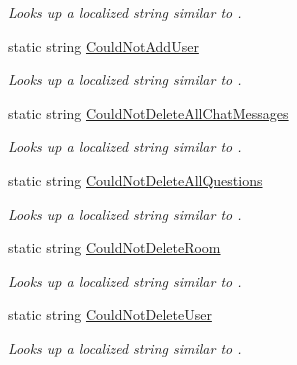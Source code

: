 \begin{DoxyCompactItemize}
\begin{DoxyCompactList}\small\item\em Looks up a localized string similar to . \end{DoxyCompactList}\item 
static string \hyperlink{class_wis_r_1_1_app___resources_1_1_resource_a2d577b28914c23184e26900b893ded3a}{Could\+Not\+Add\+User}
\begin{DoxyCompactList}\small\item\em Looks up a localized string similar to . \end{DoxyCompactList}\item 
static string \hyperlink{class_wis_r_1_1_app___resources_1_1_resource_a946c2f85e7a24d26d3e04e654b197556}{Could\+Not\+Delete\+All\+Chat\+Messages}
\begin{DoxyCompactList}\small\item\em Looks up a localized string similar to . \end{DoxyCompactList}\item 
static string \hyperlink{class_wis_r_1_1_app___resources_1_1_resource_a3880db29512208af00f95d971552954e}{Could\+Not\+Delete\+All\+Questions}
\begin{DoxyCompactList}\small\item\em Looks up a localized string similar to . \end{DoxyCompactList}\item 
static string \hyperlink{class_wis_r_1_1_app___resources_1_1_resource_a36bd047d6103bfcd6e8349b0d59a05a4}{Could\+Not\+Delete\+Room}
\begin{DoxyCompactList}\small\item\em Looks up a localized string similar to . \end{DoxyCompactList}\item 
static string \hyperlink{class_wis_r_1_1_app___resources_1_1_resource_a09835ac5eb60ef0eea1578e43ecdefbc}{Could\+Not\+Delete\+User}
\begin{DoxyCompactList}\small\item\em Looks up a localized string similar to . \end{DoxyCompactList}\item 

\end{DoxyCompactItemize}
